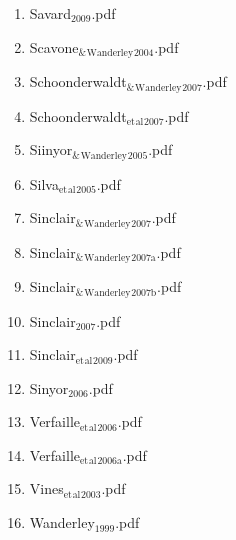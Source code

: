 \documentclass[11pt]{article}
\begin{document}
\begin{enumerate}
\begin{enumerate}
\begin{enumerate}
\item Savard$_{\text{2009}}$.pdf
\label{sec-1-1-1-1-15-7-2-51}

\item Scavone$_{\text{\&}}$$_{\text{Wanderley}}$$_{\text{2004}}$.pdf
\label{sec-1-1-1-1-15-7-2-52}

\item Schoonderwaldt$_{\text{\&}}$$_{\text{Wanderley}}$$_{\text{2007}}$.pdf
\label{sec-1-1-1-1-15-7-2-53}

\item Schoonderwaldt$_{\text{et}}$$_{\text{al}}$$_{\text{2007}}$.pdf
\label{sec-1-1-1-1-15-7-2-54}

\item Siinyor$_{\text{\&}}$$_{\text{Wanderley}}$$_{\text{2005}}$.pdf
\label{sec-1-1-1-1-15-7-2-55}

\item Silva$_{\text{et}}$$_{\text{al}}$$_{\text{2005}}$.pdf
\label{sec-1-1-1-1-15-7-2-56}

\item Sinclair$_{\text{\&}}$$_{\text{Wanderley}}$$_{\text{2007}}$.pdf
\label{sec-1-1-1-1-15-7-2-57}

\item Sinclair$_{\text{\&}}$$_{\text{Wanderley}}$$_{\text{2007a}}$.pdf
\label{sec-1-1-1-1-15-7-2-58}

\item Sinclair$_{\text{\&}}$$_{\text{Wanderley}}$$_{\text{2007b}}$.pdf
\label{sec-1-1-1-1-15-7-2-59}

\item Sinclair$_{\text{2007}}$.pdf
\label{sec-1-1-1-1-15-7-2-60}

\item Sinclair$_{\text{et}}$$_{\text{al}}$$_{\text{2009}}$.pdf
\label{sec-1-1-1-1-15-7-2-61}

\item Sinyor$_{\text{2006}}$.pdf
\label{sec-1-1-1-1-15-7-2-62}

\item Verfaille$_{\text{et}}$$_{\text{al}}$$_{\text{2006}}$.pdf
\label{sec-1-1-1-1-15-7-2-63}

\item Verfaille$_{\text{et}}$$_{\text{al}}$$_{\text{2006a}}$.pdf
\label{sec-1-1-1-1-15-7-2-64}

\item Vines$_{\text{et}}$$_{\text{al}}$$_{\text{2003}}$.pdf
\label{sec-1-1-1-1-15-7-2-65}

\item Wanderley$_{\text{1999}}$.pdf
\label{sec-1-1-1-1-15-7-2-66}


\end{enumerate}
\end{enumerate}
\end{enumerate}
\end{document}
